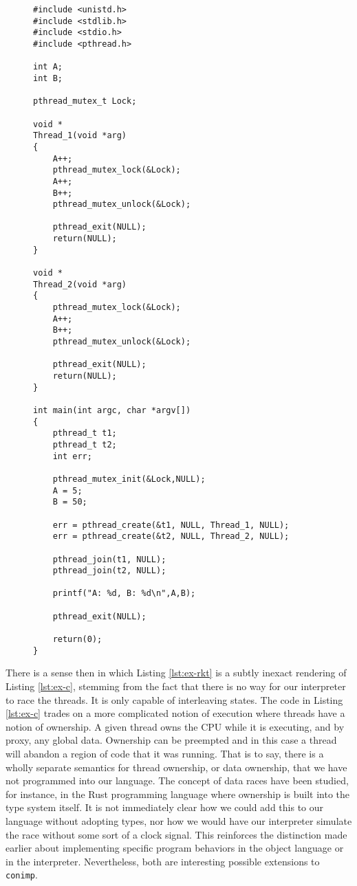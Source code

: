 \begin{figure}
\begin{lstlisting}[label={lst:ex-c},caption={Two threads concurrently updating a global store (C).},captionpos=b,frame=single,xrightmargin=1em]
#include <unistd.h>
#include <stdlib.h>
#include <stdio.h>
#include <pthread.h>

int A;
int B;

pthread_mutex_t Lock;

void *
Thread_1(void *arg)
{
	A++;
	pthread_mutex_lock(&Lock);
	A++;
	B++;
	pthread_mutex_unlock(&Lock);

	pthread_exit(NULL);
	return(NULL);
}

void *
Thread_2(void *arg)
{
	pthread_mutex_lock(&Lock);
	A++;
	B++;
	pthread_mutex_unlock(&Lock);

	pthread_exit(NULL);
	return(NULL);
}

int main(int argc, char *argv[])
{
	pthread_t t1;
	pthread_t t2;
	int err;

	pthread_mutex_init(&Lock,NULL);
	A = 5;
	B = 50;

	err = pthread_create(&t1, NULL, Thread_1, NULL);
	err = pthread_create(&t2, NULL, Thread_2, NULL);

	pthread_join(t1, NULL);
	pthread_join(t2, NULL);

	printf("A: %d, B: %d\n",A,B);

	pthread_exit(NULL);

	return(0);
}
\end{lstlisting}
\end{figure}

There is a sense then in which Listing \ref{lst:ex-rkt} is a subtly inexact rendering of Listing \ref{lst:ex-c}, stemming from the fact that there is no way for our interpreter to race the threads.  It is only capable of interleaving states.  The code in Listing \ref{lst:ex-c} trades on a more complicated notion of execution where threads have a notion of ownership.  A given thread owns the CPU while it is executing, and by proxy, any global data.  Ownership can be preempted and in this case a thread will abandon a region of code that it was running.  That is to say, there is a wholly separate semantics for thread ownership, or data ownership, that we have not programmed into our language.  The concept of data races have been studied, for instance, in the Rust programming language \citep{rust2018} where ownership is built into the type system itself.  It is not immediately clear how we could add this to our language without adopting types, nor how we would have our interpreter simulate the race without some sort of a clock signal.  This reinforces the distinction made earlier about implementing specific program behaviors in the object language or in the interpreter.  Nevertheless, both are interesting possible extensions to \texttt{conimp}.  

